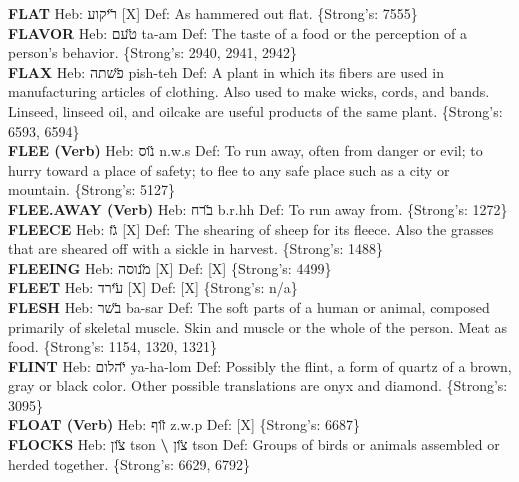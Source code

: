 {\textbf{FLAT} Heb: {\large\H ריקוע} {[}X{]} Def: As hammered out flat. \{Strong's: 7555\}\hfill{}\\

\textbf{FLAVOR} Heb: {\large\H טעם} ta-am Def: The taste of a food or the perception of a person's behavior. \{Strong's: 2940, 2941, 2942\}\hfill{}\\

\textbf{FLAX} Heb: {\large\H פשתה} pish-teh Def: A plant in which its fibers are used in manufacturing articles of clothing. Also used to make wicks, cords, and bands. Linseed, linseed oil, and oilcake are useful products of the same plant. \{Strong's: 6593, 6594\}\hfill{}\\

\textbf{FLEE (Verb)} Heb: {\large\H נוס} n.w.s Def: To run away, often from danger or evil; to hurry toward a place of safety; to flee to any safe place such as a city or mountain. \{Strong's: 5127\}\hfill{}\\

\textbf{FLEE.AWAY (Verb)} Heb: {\large\H ברח} b.r.hh Def: To run away from. \{Strong's: 1272\}\hfill{}\\

\textbf{FLEECE} Heb: {\large\H גז} {[}X{]} Def: The shearing of sheep for its fleece. Also the grasses that are sheared off with a sickle in harvest. \{Strong's: 1488\}\hfill{}\\

\textbf{FLEEING} Heb: {\large\H מנוסה} {[}X{]} Def: {[}X{]} \{Strong's: 4499\}\hfill{}\\

\textbf{FLEET} Heb: {\large\H עירד} {[}X{]} Def: {[}X{]} \{Strong's: n/a\}\hfill{}\\

\textbf{FLESH} Heb: {\large\H בשר} ba-sar Def: The soft parts of a human or animal, composed primarily of skeletal muscle. Skin and muscle or the whole of the person. Meat as food. \{Strong's: 1154, 1320, 1321\}\hfill{}\\

\textbf{FLINT} Heb: {\large\H יהלום} ya-ha-lom Def: Possibly the flint, a form of quartz of a brown, gray or black color. Other possible translations are onyx and diamond. \{Strong's: 3095\}\hfill{}\\

\textbf{FLOAT (Verb)} Heb: {\large\H זוף} z.w.p Def: {[}X{]} \{Strong's: 6687\}\hfill{}\\

\textbf{FLOCKS} Heb: {\large\H צון} tson \textbf{\textbackslash{}} {\large\H צון} tson Def: Groups of birds or animals assembled or herded together. \{Strong's: 6629, 6792\}\hfill{}\\

}
